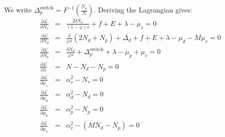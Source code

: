 \documentclass[english, a4paper]{article}
\theoremstyle{plain}
\theoremstyle{definition}
\theoremstyle{remark}
\begin{document}
We write $\Delta_p^{\text{switch}} = F^{-1}\left( \frac{N_p}{N} \right)$. Deriving the Lagrangian gives:
\begin{eqnarray}
\label{eqnarray_varphi1_partialNs2}
\frac{\partial \mathcal{L}}{\partial N_s} &=& \frac{2\delta N_s}{(1-\varphi)s} + f + E + \lambda - \mu_s = 0\\
\label{eqnarray_varphi1_partialNd2}
\frac{\partial \mathcal{L}}{\partial N_d} &=& \frac{\delta}{\varphi s} (2N_d + N_p) + \overline{\Delta_d} + f + E + \lambda - \mu_d - M\mu_v = 0\\
\label{eqnarray_varphi1_partialNp2}
\frac{\partial \mathcal{L}}{\partial N_p} &=& \frac{\delta N_d}{\varphi s} + \Delta_p^{\text{switch}} + \lambda - \mu_p + \mu_v = 0\\
\frac{\partial \mathcal{L}}{\partial \lambda} &=& N - N_d - N_p = 0\\
\frac{\partial \mathcal{L}}{\partial \mu_s} &=& \alpha_s^2 - N_s = 0\\
\frac{\partial \mathcal{L}}{\partial \mu_d} &=& \alpha_d^2 - N_d = 0\\
\frac{\partial \mathcal{L}}{\partial \mu_p} &=& \alpha_p^2 - N_p = 0\\
\frac{\partial \mathcal{L}}{\partial \mu_v} &=& \alpha_v^2 - (MN_d - N_p) = 0
\end{eqnarray}
\end{document}
